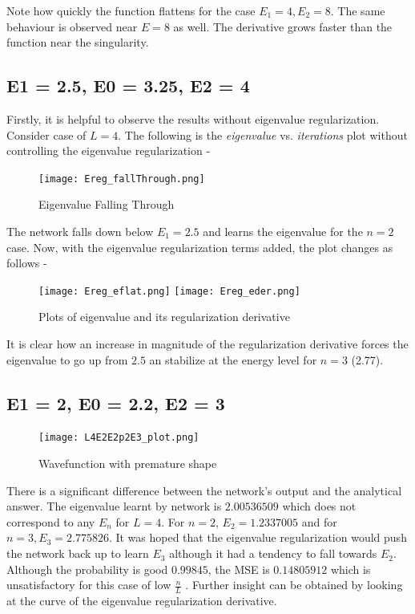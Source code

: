 \documentclass{article}
\newcommand{\iterations}{\textit{iterations} }
\newcommand{\eigenvalue}{\textit{eigenvalue} }
\newcommand{\nLratio}{$\displaystyle{\frac{n}{L}}$ }
\begin{document}
\justify
Note how quickly the function flattens for the case $E_1 = 4, E_2 = 8$. The same behaviour is observed near $E=8$ as well. The derivative grows faster than the function near the singularity.

\subsection{E1 = 2.5, E0 = 3.25, E2 = 4}

\justify
Firstly, it is helpful to observe the results without eigenvalue regularization. Consider case of $L=4$. The following is the \eigenvalue vs. \iterations plot without controlling the eigenvalue regularization -

\begin{figure}[!htb]
    \centering
    \texttt{[image: Ereg\_fallThrough.png]}
    \label{fig:Ereg_fallThrough}
    \caption{Eigenvalue Falling Through}
\end{figure}

\justify
The network falls down below $E_1 = 2.5$ and learns the eigenvalue for the $n=2$ case. Now, with the eigenvalue regularization terms added, the plot changes as follows -
\begin{figure}[!htb]
    \texttt{[image: Ereg\_eflat.png]}
    \label{fig:Ereg_stable}
    \texttt{[image: Ereg\_eder.png]}
    \label{fig:Ereg_der}
    \caption{Plots of eigenvalue and its regularization derivative}
\end{figure}

\justify
It is clear how an increase in magnitude of the regularization derivative forces the eigenvalue to go up from $2.5$ an stabilize at the energy level for $n=3$ (2.77).

\subsection{E1 = 2, E0 = 2.2, E2 = 3}

\begin{figure}[!htb]
    \centering
    \texttt{[image: L4E2E2p2E3\_plot.png]}
    \label{fig:Ereg_fallThrough}
    \caption{Wavefunction with premature shape}
\end{figure}

\justify
There is a significant difference between the network's output and the analytical answer. The eigenvalue learnt by network is $2.00536509$ which does not correspond to any $E_n$ for $L=4$. For $n=2$, $E_2 = 1.2337005$ and for $n=3, E_3 = 2.775826$. It was hoped that the eigenvalue regularization would push the network back up to learn $E_3$ although it had a tendency to fall towards $E_2$. Although the probability is good $0.99845$, the MSE is $0.14805912$ which is unsatisfactory for this case of low \nLratio. Further insight can be obtained by looking at the curve of the eigenvalue regularization derivative.
\end{document}
